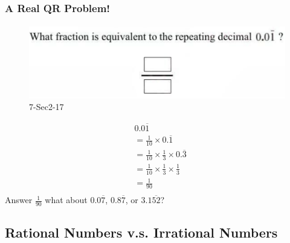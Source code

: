 \documentclass[
	11pt, %
]{beamer}
\begin{document}
\begin{frame}
	\frametitle{A Real QR Problem!}
	\framesubtitle{}
	\begin{figure}
		\includegraphics[width=0.6\linewidth]{Decimal_Example_Question1.png}
		\caption{7-Sec2-17}
	\end{figure}
	\pause
\begin{equation*}
	\begin{aligned}
	&0.0\overline{1}  \\
	& =\frac{1}{10} \times 0.\overline{1} \\
	& =\frac{1}{10} \times  \frac{1}{3} \times 0.\overline{3} \\
	& =\frac{1}{10} \times  \frac{1}{3} \times \frac{1}{3} \\
	& = \frac{1}{90}\\
	\end{aligned}
\end{equation*}
\pause
\bigskip
Answer \textbf{$\frac{1}{90}$} \quad what about $0.0\overline{7}$, $0.8\overline{7}$, or $3.1\overline{52}$?
\end{frame}


\subsection{Rational Numbers v.s. Irrational Numbers}

\end{document}
